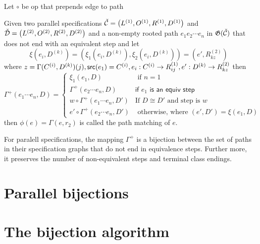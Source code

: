 Let $\circ$ be op that prepends edge to path
\begin{definition}
Given two parallel specifications $\check{\mathcal{C}} = \left(L^{(1)}, O^{(1)}, R^{(1)}, D^{(1)}\right)$ and $\check{\mathcal{D}} = \left(L^{(2)}, O^{(2)}, R^{(2)}, D^{(2)}\right)$ and a non-empty rooted path $e_1e_2 \cdots e_n$ in $\mathfrak{G}(\check{\mathcal{C}})$ that does not end with an equivalent step and let
\[
    \xi(e_i,D^{(k)})  = (\xi_1(e_i,D^{(k)}),\xi_2(e_i,D^{(k)})) = (e',R^{(2)}_{kz})  
\]
where $z=\Gamma(C^{(i)}, D^{(k)})(j), \textsf{src}(e_1) = C^{(i)}, e_i: C^{(i)}\to R^{(1)}_{ij}, e': D^{(k)} \to R^{(2)}_{kz}$ then
\[
    \Gamma^+(e_1\cdots e_n,D) =  \begin{cases}
        \xi_1(e_1,D) & \text{ if $n=1$}\\
        \Gamma^+(e_2 \cdots e_n,D) & \textsf{if $e_1$ is an equiv step}\\
        w \circ \Gamma^+(e_1 \cdots e_n, D') & \text{If $D \cong D'$ and step is $w$}\\
        e' \circ \Gamma^+(e_2\dotsm e_n, D') & \text{ otherwise, where } (e',D') = \xi(e_1,D)
    \end{cases}
\]
then $\phi(e) = \Gamma(e,r_2)$ is called the path matching of $e$.
\end{definition}

\begin{proposition}
For paralell specifications, the mapping $\Gamma^+$ is a bijection between the set of paths in their specification graphs that do not end in equivalence steps. Further more, it preserves the number of non-equivalent steps and terminal class endings. 
\end{proposition}

\section{Parallel bijections}
\section{The bijection algorithm}